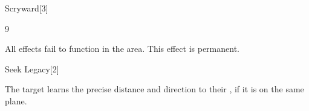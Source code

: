 \begin{spellsection}{Scryward}[3]

\begin{spellcontent}

\begin{spelltargetinginfo}


 9
\end{spelltargetinginfo}


\begin{spelleffects}



\spelleffect
All  effects fail to function in the area.
This effect is permanent.








\end{spelleffects}

\end{spellcontent}
\begin{spellfooter}


\end{spellfooter}
\begin{spellsubcontent}


\end{spellsubcontent}
\end{spellsection}


\begin{spellsection}{Seek Legacy}[2]

\begin{spellcontent}

\begin{spelltargetinginfo}




\end{spelltargetinginfo}


\begin{spelleffects}



\spelleffect
The target learns the precise distance and direction to their , if it is on the same plane.








\end{spelleffects}

\end{spellcontent}
\begin{spellfooter}


\end{spellfooter}
\begin{spellsubcontent}


\end{spellsubcontent}
\end{spellsection}


